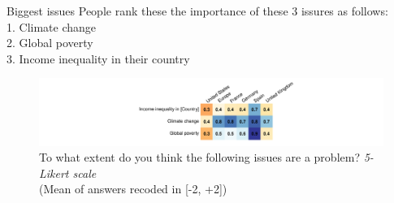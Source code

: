 \begin{framefont}{\small}
\begin{frame}{Biggest issues\label{}}
	\bbvs \ip People rank these the importance of these 3 issures as follows: \\ 1. Climate change \\ 2. Global poverty \\ 3. Income inequality in their country
    \ee
    \begin{figure}
        \centering 
        \caption{To what extent do you think the following issues are a problem? \textit{5-Likert scale} \\(Mean of answers recoded in [-2, +2])
        }
        \vspace{-.2cm}
        \includegraphics[width=.7\textwidth]{../figures/country_comparison/problem_mean.pdf} 
    \end{figure}
\end{frame}




\end{framefont}
